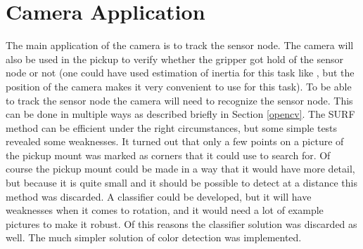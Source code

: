 \section{Camera Application}
The main application of the camera is to track the sensor node. The camera will also be used in the pickup to verify whether the gripper got hold of the sensor node or not (one could have used estimation of inertia for this task like \citep{Mellinger2011}, but the position of the camera makes it very convenient to use for this task). To be able to track the sensor node the camera will need to recognize the sensor node. This can be done in multiple ways as described briefly in Section \ref{opencv}. The SURF method can be efficient under the right circumstances, but some simple tests revealed some weaknesses. It turned out that only a few points on a picture of the pickup mount was marked as corners that it could use to search for. Of course the pickup mount could be made in a way that it would have more detail, but because it is quite small and it should be possible to detect at a distance this method was discarded. A classifier could be developed, but it will have weaknesses when it comes to rotation, and it would need a lot of example pictures to make it robust. Of this reasons the classifier solution was discarded as well. The much simpler solution of color detection was implemented.
